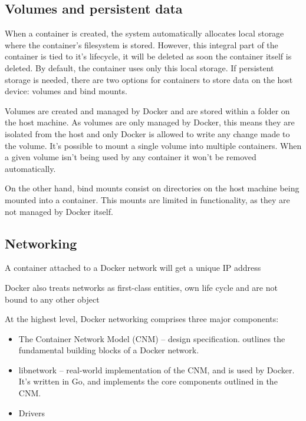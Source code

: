



\subsection{Volumes and persistent data}
\label{sec::arch:volumes}

When a container is created, the system automatically allocates local storage where the container's filesystem is stored. However, this integral part of the container is tied to it's lifecycle, it will be deleted as soon the container itself is deleted. By default, the container uses only this local storage. If persistent storage is needed, there are two options for containers to store data on the host device: volumes and bind mounts\cite{container-storage}.

Volumes are created and managed by Docker and are stored within a folder on the host machine. As volumes are only managed by Docker, this means they are isolated from the host and only Docker is allowed to write any change made to the volume. It's possible to mount a single volume into multiple containers. When a given volume isn't being used by any container it won't be removed automatically.

On the other hand, bind mounts consist on directories on the host machine being mounted into a container. This mounts are limited in functionality, as they are not managed by Docker itself.




\subsection{Networking}
\label{ssec::arch:net}

A container attached to a Docker network will get a unique IP address

Docker also treats networks as first-class entities, own life cycle and are not bound to any other object

At the highest level, Docker networking comprises three major components:

\begin{itemize}
    \item The Container Network Model (CNM) -- design specification. outlines the fundamental building blocks of a Docker network.
    \item libnetwork -- real-world implementation of the CNM, and is used by Docker. It's written in Go, and implements the core components outlined in the CNM.
    \item Drivers
\end{itemize}

